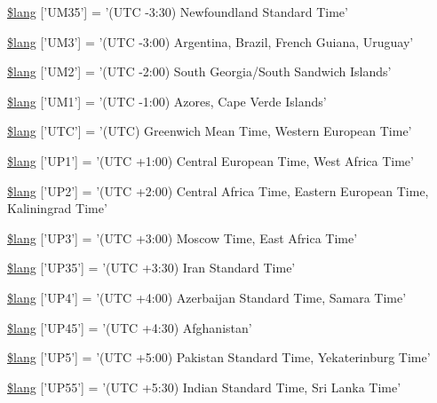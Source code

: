 \begin{DoxyCompactItemize}
\item 
\hyperlink{date__lang_8php_a389c4a60af83efd29503f60033f3071d}{\$lang} \mbox{[}'U\-M35'\mbox{]} = '(U\-T\-C -\/3\-:30) Newfoundland Standard Time'
\item 
\hyperlink{date__lang_8php_abd67512895187d494bbfb18f8d8fee43}{\$lang} \mbox{[}'U\-M3'\mbox{]} = '(U\-T\-C -\/3\-:00) Argentina, Brazil, French Guiana, Uruguay'
\item 
\hyperlink{date__lang_8php_a8ee2f132b462bb709fc3402a592ff573}{\$lang} \mbox{[}'U\-M2'\mbox{]} = '(U\-T\-C -\/2\-:00) South Georgia/South Sandwich Islands'
\item 
\hyperlink{date__lang_8php_a036e0074236b996b33231b051eda2973}{\$lang} \mbox{[}'U\-M1'\mbox{]} = '(U\-T\-C -\/1\-:00) Azores, Cape Verde Islands'
\item 
\hyperlink{date__lang_8php_ab153b3219e74743184b7dee67e86f9fc}{\$lang} \mbox{[}'U\-T\-C'\mbox{]} = '(U\-T\-C) Greenwich Mean Time, Western European Time'
\item 
\hyperlink{date__lang_8php_a788996558e6c8cafd788a1fef6b0be4e}{\$lang} \mbox{[}'U\-P1'\mbox{]} = '(U\-T\-C +1\-:00) Central European Time, West Africa Time'
\item 
\hyperlink{date__lang_8php_adfeba045961d07f8f30c0f1a7b8b4ff9}{\$lang} \mbox{[}'U\-P2'\mbox{]} = '(U\-T\-C +2\-:00) Central Africa Time, Eastern European Time, Kaliningrad Time'
\item 
\hyperlink{date__lang_8php_a5eddd4b83edcbefcc883077949d40a67}{\$lang} \mbox{[}'U\-P3'\mbox{]} = '(U\-T\-C +3\-:00) Moscow Time, East Africa Time'
\item 
\hyperlink{date__lang_8php_ad669ea69fd450762d029592b6ac64395}{\$lang} \mbox{[}'U\-P35'\mbox{]} = '(U\-T\-C +3\-:30) Iran Standard Time'
\item 
\hyperlink{date__lang_8php_ad0131a14a1ede9328baf1a1827602f45}{\$lang} \mbox{[}'U\-P4'\mbox{]} = '(U\-T\-C +4\-:00) Azerbaijan Standard Time, Samara Time'
\item 
\hyperlink{date__lang_8php_a7795735f3608127d726a4fca3f87dc79}{\$lang} \mbox{[}'U\-P45'\mbox{]} = '(U\-T\-C +4\-:30) Afghanistan'
\item 
\hyperlink{date__lang_8php_a08236ffa5ff4db9f2bc023f5256fead1}{\$lang} \mbox{[}'U\-P5'\mbox{]} = '(U\-T\-C +5\-:00) Pakistan Standard Time, Yekaterinburg Time'
\item 
\hyperlink{date__lang_8php_aa55a1ebecdfbd5e0c7e40c921b90cad2}{\$lang} \mbox{[}'U\-P55'\mbox{]} = '(U\-T\-C +5\-:30) Indian Standard Time, Sri Lanka Time'
\item 

\end{DoxyCompactItemize}
